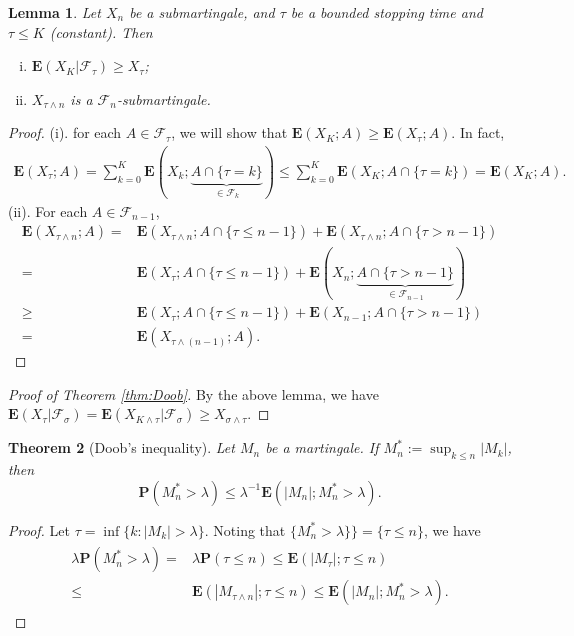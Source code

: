 \documentclass[twoside, 12pt]{book}
\numberwithin{equation}{chapter}
\newtheorem{theorem}{Theorem}[section]
\newtheorem{lemma}[theorem]{Lemma}
\def\cF{{\mathcal F}}
\def\bE{{\mathbf E}}
\def\bP{{\mathbf P}}
\def\geq{\geqslant}
\def\leq{\leqslant}
\begin{document}
	\begin{lemma}
		Let  $X_n$ be a submartingale, and $\tau$ be a bounded stopping time and $\tau\leq K$ (constant). Then 
		\begin{enumerate}[(i)]
			\item $\bE(X_{K}|\cF_\tau)\geq X_\tau$; 
			\item $X_{\tau\wedge n}$ is a $\cF_n$-submartingale. 
		\end{enumerate}
	\end{lemma}
	\begin{proof}
		(i). for each $A\in \cF_\tau$, we will show that $\bE(X_K; A)\geq \bE (X_\tau; A)$. In fact, 
		\begin{align*}
			\bE (X_\tau; A)=\sum_{k=0}^K \bE (X_{k}; \underbrace{A\cap \{\tau=k\}}_{\in \cF_k})\leq \sum_{k=0}^K \bE (X_{K}; A\cap \{\tau=k\}) = \bE (X_K; A). 
		\end{align*}
		(ii). For each $A\in \cF_{n-1}$, 
		\begin{align*}
			\bE(X_{\tau\wedge n}; A)=&\bE(X_{\tau\wedge n}; A\cap\{\tau\leq n-1\})+\bE(X_{\tau\wedge n}; A\cap\{\tau> n-1\})\\
			=&\bE(X_{\tau}; A\cap\{\tau \leq n-1\})+\bE(X_{n}; \underbrace{A\cap\{\tau> n-1\}}_{\in \cF_{n-1}})\\
			\geq& \bE(X_{\tau}; A\cap\{\tau\leq n-1\})+\bE(X_{n-1}; A\cap\{\tau> n-1\})\\
			=& \bE(X_{\tau\wedge (n-1)}; A).
		\end{align*}
	\end{proof}
	
	\begin{proof}[Proof of Theorem \ref{thm:Doob}]
		By the above lemma, we have $\bE (X_{\tau}|\cF_{\sigma})=\bE (X_{K\wedge \tau}|\cF_{\sigma})\geq X_{\sigma\wedge \tau}$.  
	\end{proof}
	\begin{theorem}[Doob's inequality]\label{Thm-Doob-Max}
		Let $M_n$ be a martingale. If $M_n^*:=\sup_{k\leq n} |M_k|$, then 
		$$
		\bP(M^*_n>\lambda) \leq \lambda^{-1} \bE (|M_n|;M_n^*>\lambda). 
		$$
	\end{theorem}
	\begin{proof}
		Let $\tau=\inf\{k: |M_k|>\lambda\}$.  Noting that $\{M^*_n>\lambda\}\}=\{\tau \leq n\}$, we have 
		\begin{align*}
			\begin{aligned}
				\lambda \bP (M^*_n>\lambda)=&\lambda \bP(\tau\leq n)\leq \bE(|M_\tau|;\tau\leq n)\\
				\leq &\bE (|M_{\tau 
					\wedge n}|; \tau\leq n) \leq  \bE(|M_n|; M_n^*>\lambda). 
			\end{aligned}
		\end{align*}
	\end{proof}
	
\end{document}
